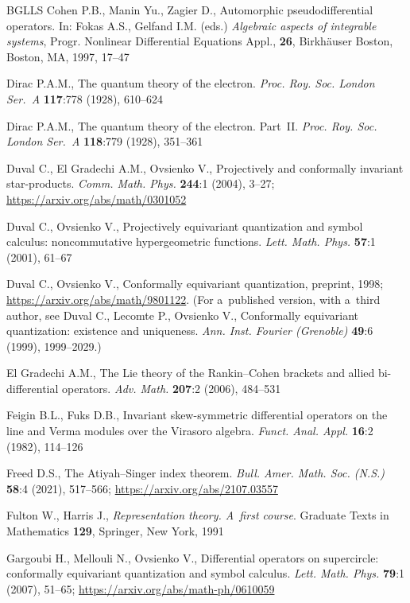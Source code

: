 \documentclass[12pt,a4paper]{amsart}
\theoremstyle{thm}
\theoremstyle{definition}
\begin{document}
\begin{thebibliography}{BGLLS}
Cohen P.B., Manin Yu., Zagier D., Automorphic pseudodifferential operators. In: Fokas A.S.,
Gelfand I.M. (eds.) \textit{Algebraic aspects of integrable systems}, Progr. Nonlinear
Differential Equations Appl., \textbf{26}, Birkh\"auser Boston, Boston, MA, 1997, 17--47

Dirac P.A.M., The quantum theory of the electron. \textit{Proc. Roy. Soc. London Ser.~A}
\textbf{117}:778 (1928), 610--624

Dirac P.A.M., The quantum theory of the electron. Part~II.
\textit{Proc. Roy. Soc. London Ser.~A} \textbf{118}:779 (1928), 351--361

Duval C., El Gradechi A.M., Ovsienko V., Projectively and conformally invariant
star-products. \textit{Comm. Math. Phys.} \textbf{244}:1 (2004), 3--27;
\url{https://arxiv.org/abs/math/0301052}

Duval C., Ovsienko V., Projectively equivariant quantization and symbol calculus:
noncommutative hypergeometric functions. \textit{Lett. Math. Phys.} \textbf{57}:1 (2001),
61--67

Duval C., Ovsienko V., Conformally equivariant quantization, preprint, 1998;
\url{https://arxiv.org/abs/math/9801122}. \textup{(}For a~published version, with a~third
author, see Duval C., Lecomte P., Ovsienko V., Conformally equivariant quantization:
existence and uniqueness. \textit{Ann. Inst. Fourier \textup{(}Grenoble\textup{)}}
\textbf{49}:6 (1999), 1999--2029.\textup{)}

El Gradechi A.M., The Lie theory of the Rankin--Cohen brackets and allied bi-differential
operators. \textit{Adv. Math.} \textbf{207}:2 (2006), 484--531

Feigin B.L., Fuks D.B., Invariant skew-symmetric differential operators on the line and
Verma modules over the Virasoro algebra. \textit{Funct. Anal. Appl.} \textbf{16}:2 (1982),
114--126

Freed D.S., The Atiyah--Singer index theorem. \textit{Bull. Amer. Math. Soc. \textup{(}N.S.\textup{)}}
\textbf{58}:4 (2021), 517--566; \url{https://arxiv.org/abs/2107.03557}

Fulton W., Harris J., \textit{Representation theory. A~first course}. Graduate Texts in
Mathematics \textbf{129}, Springer, New York, 1991

Gargoubi H., Mellouli N., Ovsienko V., Differential operators on supercircle: conformally
equivariant quantization and symbol calculus. \textit{Lett. Math. Phys.} \textbf{79}:1
(2007), 51--65; \url{https://arxiv.org/abs/math-ph/0610059}


\end{thebibliography}
\end{document}
